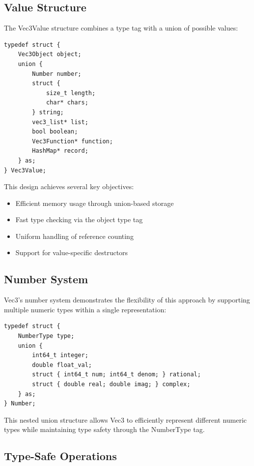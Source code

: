 \subsection{Value Structure}\label{subsec:value-structure}

The Vec3Value structure combines a type tag with a union of possible values:

\begin{verbatim}
typedef struct {
    Vec3Object object;
    union {
        Number number;
        struct {
            size_t length;
            char* chars;
        } string;
        vec3_list* list;
        bool boolean;
        Vec3Function* function;
        HashMap* record;
    } as;
} Vec3Value;
\end{verbatim}

This design achieves several key objectives:

\begin{itemize}[nolistsep]
    \item Efficient memory usage through union-based storage
    \item Fast type checking via the object type tag
    \item Uniform handling of reference counting
    \item Support for value-specific destructors
\end{itemize}

\subsection{Number System}\label{subsec:number-system}

Vec3's number system demonstrates the flexibility of this approach by supporting multiple numeric types within a single representation:

\begin{verbatim}
typedef struct {
    NumberType type;
    union {
        int64_t integer;
        double float_val;
        struct { int64_t num; int64_t denom; } rational;
        struct { double real; double imag; } complex;
    } as;
} Number;
\end{verbatim}

This nested union structure allows Vec3 to efficiently represent different numeric types while maintaining type safety through the NumberType tag.

\subsection{Type-Safe Operations}\label{subsec:type-safe-operations}

